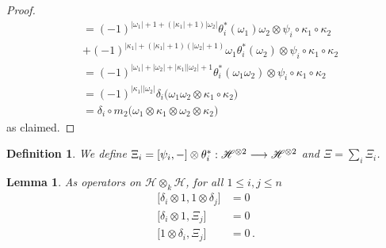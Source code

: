 \documentclass[english,letter paper,12pt,leqno]{article}
\newtheorem{lemma}[theorem]{Lemma}
\theoremstyle{example}
\newtheorem{definition}[theorem]{Definition}
\numberwithin{equation}{section}
\begin{document}
\begin{proof}
\begin{align*}
&= (-1)^{|\omega_1|+1+(|\kappa_1|+1)|\omega_2|} \theta_i^*(\omega_1) \omega_2 \otimes \psi_i \circ \kappa_1 \circ \kappa_2\\
&+ (-1)^{|\kappa_1|+(|\kappa_1|+1)(|\omega_2|+1)} \omega_1 \theta_i^*(\omega_2) \otimes \psi_i \circ \kappa_1 \circ \kappa_2\\
&= (-1)^{|\omega_1|+|\omega_2|+|\kappa_1||\omega_2|+1} \theta_i^*( \omega_1 \omega_2 ) \otimes \psi_i \circ \kappa_1 \circ \kappa_2\\
&= (-1)^{|\kappa_1||\omega_2|}\delta_i\big( \omega_1 \omega_2 \otimes \kappa_1 \circ \kappa_2 \big)\\
&= \delta_i \circ m_2\big( \omega_1 \otimes \kappa_1 \otimes \omega_2 \otimes \kappa_2 \big)
\end{align*}
as claimed.
\end{proof}

\begin{definition} We define $\Xi_i = [ \psi_i, - ] \otimes \theta_i^* : \mathscr{H}^{\otimes 2} \longrightarrow \mathscr{H}^{\otimes 2}$ and $\Xi = \sum_i \Xi_i$. 
\end{definition}

\begin{lemma}\label{lemma:somecommt} As operators on $\mathscr{H} \otimes_k \mathscr{H}$, for all $1 \le i,j \le n$
\begin{align}
\big[ \delta_i \otimes 1, 1 \otimes \delta_j \big] &= 0\\
\big[ \delta_i \otimes 1, \Xi_j \big] &= 0\\
\big[ 1 \otimes \delta_i, \Xi_j \big] &= 0\,.
\end{align}
\end{lemma}
\end{document}
